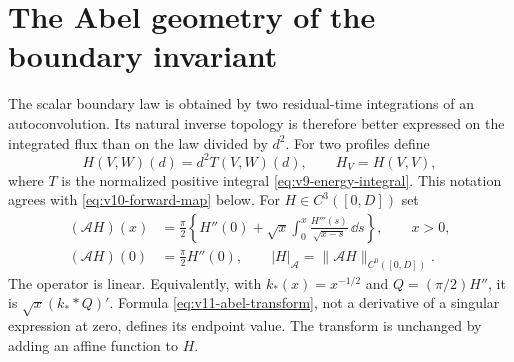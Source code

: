 \section{The Abel geometry of the boundary invariant}
\label{sec:v11-abel}
The scalar boundary law is obtained by two residual-time integrations
of an autoconvolution. Its natural inverse topology is therefore better
expressed on the integrated flux than on the law divided by $d^2$.
For two profiles define
\[
 H(V,W)(d)=d^2T(V,W)(d),\qquad H_V=H(V,V),
\]
where $T$ is the normalized positive integral
\eqref{eq:v9-energy-integral}. This notation agrees with
\eqref{eq:v10-forward-map} below. For $H\in C^3([0,D])$ set
\begin{equation}\label{eq:v11-abel-transform}
 \begin{split}
 (\mathscr AH)(x)
 &=\frac\pi2\left\{H''(0)+\sqrt{x}
              \int_0^x\frac{H'''(s)}{\sqrt{x-s}}\,\dd s\right\},
                  \qquad x>0,\\
 (\mathscr AH)(0)&=\frac\pi2 H''(0),\qquad
 |H|_{\mathscr A}=\|\mathscr AH\|_{C^0([0,D])}.
 \end{split}
\end{equation}
The operator is linear. Equivalently, with $k_*(x)=x^{-1/2}$ and
$Q=(\pi/2)H''$, it is $\sqrt{x}(k_* *Q)'$. Formula
\eqref{eq:v11-abel-transform}, not a derivative of a singular
expression at zero, defines its endpoint value. The transform is
unchanged by adding an affine function to $H$.

